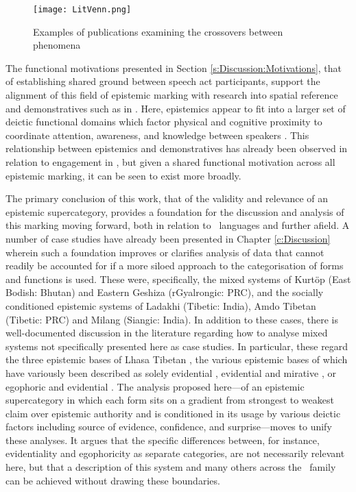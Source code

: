 \begin{figure}
    \centering
    \texttt{[image: LitVenn.png]}
    \caption{Examples of publications examining the crossovers between phenomena}
    \label{f:Conclusion:LitVenn}
\end{figure}

The functional motivations presented in Section \ref{s:Discussion:Motivations}, that of establishing shared ground between speech act participants, support the alignment of this field of epistemic marking with research into spatial reference and demonstratives such as in . Here, epistemics appear to fit into a larger set of deictic functional domains which factor physical and cognitive proximity to coordinate attention, awareness, and knowledge between speakers \cite{Peeters2016}. This relationship between epistemics and demonstratives has already been observed in relation to engagement in , but given a shared functional motivation across all epistemic marking, it can be seen to exist more broadly.

The primary conclusion of this work, that of the validity and relevance of an epistemic supercategory, provides a foundation for the discussion and analysis of this marking moving forward, both in relation to \lfam\ languages and further afield. A number of case studies have already been presented in Chapter \ref{c:Discussion} wherein such a foundation improves or clarifies analysis of data that cannot readily be accounted for if a more siloed approach to the categorisation of forms and functions is used. These were, specifically, the mixed systems of Kurtöp (East Bodish: Bhutan) and Eastern Geshiza (rGyalrongic: PRC), and the socially conditioned epistemic systems of Ladakhi (Tibetic: India), Amdo Tibetan (Tibetic: PRC) and Milang (Siangic: India). In addition to these cases, there is well-documented discussion in the literature regarding how to analyse mixed systems not specifically presented here as case studies. In particular, these regard the three epistemic bases of Lhasa Tibetan \cite{DeLancey2017Tibetan}, the various epistemic bases of which have variously been described as solely evidential \cites{Garrett2001}{Gawne2017}, evidential and mirative \cites{DeLanceyMirativity1997}{DeLancey2012}, or egophoric and evidential \cites{Tournadre1992}{Widmer2017}. The analysis proposed here---of an epistemic supercategory in which each form sits on a gradient from strongest to weakest claim over epistemic authority and is conditioned in its usage by various deictic factors including source of evidence, confidence, and surprise---moves to unify these analyses. It argues that the specific differences between, for instance, evidentiality and egophoricity as separate categories, are not necessarily relevant here, but that a description of this system and many others across the \lfam\ family can be achieved without drawing these boundaries.

